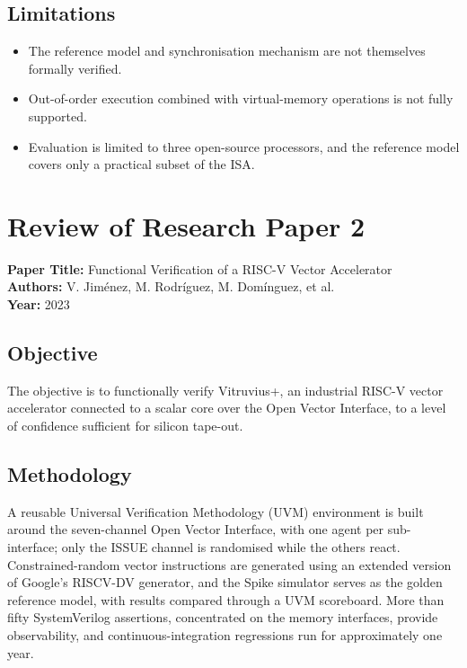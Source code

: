 \documentclass[12pt,a4paper]{report}
\begin{document}
\subsection{Limitations}
\begin{itemize}[nosep]
  \item The reference model and synchronisation mechanism are not themselves formally
        verified.
  \item Out-of-order execution combined with virtual-memory operations is not fully
        supported.
  \item Evaluation is limited to three open-source processors, and the reference model
        covers only a practical subset of the ISA.
\end{itemize}

\section{Review of Research Paper 2}
\noindent\textbf{Paper Title:} Functional Verification of a RISC-V Vector Accelerator\\
\textbf{Authors:} V. Jim\'enez, M. Rodr\'iguez, M. Dom\'inguez, et al.\\
\textbf{Year:} 2023

\subsection{Objective}
The objective is to functionally verify Vitruvius+, an industrial RISC-V vector
accelerator connected to a scalar core over the Open Vector Interface, to a level of
confidence sufficient for silicon tape-out.

\subsection{Methodology}
A reusable Universal Verification Methodology (UVM) environment is built around the
seven-channel Open Vector Interface, with one agent per sub-interface; only the ISSUE
channel is randomised while the others react. Constrained-random vector instructions are
generated using an extended version of Google's RISCV-DV generator, and the Spike
simulator serves as the golden reference model, with results compared through a UVM
scoreboard. More than fifty SystemVerilog assertions, concentrated on the memory
interfaces, provide observability, and continuous-integration regressions run for
approximately one year.
\end{document}
